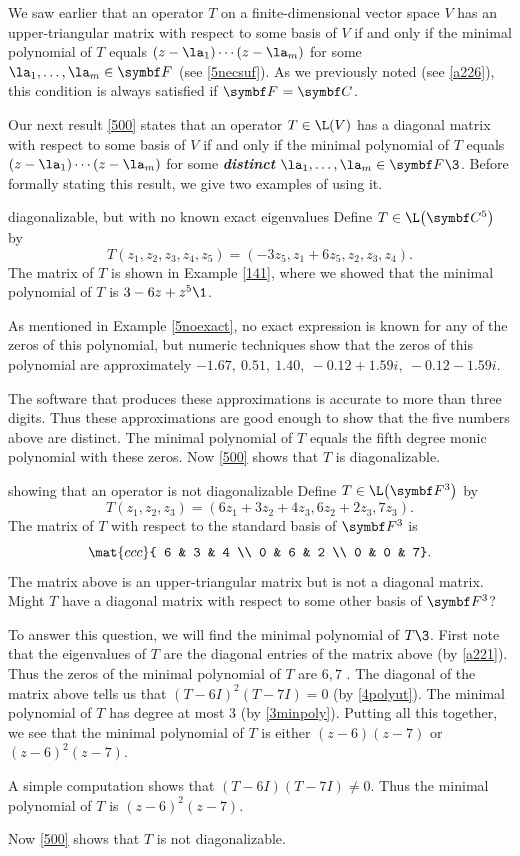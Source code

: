 We saw earlier that an operator $T$ on a finite-dimensional vector space $V$ has an upper-triangular matrix with respect to some basis of $V$ if and only if the minimal polynomial of $T$ equals $(z-\la_1) \cdots (z-\la_m)$ for some $\la_1, \ldots, \la_m \in \F{}$ (see \ref{5necsuf}). As we previously noted (see \ref{a226}), this condition is always satisfied if $\F{} = \C{}$.

Our next result \ref{500} states that an operator $T \in \L(V)$ has a diagonal matrix with respect to some basis of $V$ if and only if the minimal polynomial of $T$ equals $(z-\la_1) \cdots (z-\la_m)$ for some \textit{\textbf{distinct}} $\la_1, \ldots, \la_m \in \F{}\3$. Before formally stating this result, we give two examples of using it.

\begin{example}{diagonalizable, but with no known exact eigenvalues}
Define $T \in \L\paren[\big]{ \C5 }$ by
\[
T(z_1, z_2, z_3, z_4 ,z_5) = (-3z_5, z_1 + 6z_5, z_2, z_3, z_4).
\]
The matrix of $T$ is shown in Example \ref{141}, where we showed that the minimal polynomial of $T$ is $3 - 6z + z^5\1$.

As mentioned in Example \ref{5noexact}, no exact expression is known for any of the zeros of this polynomial, but numeric techniques show that the zeros of this polynomial are approximately
$
-1.67, \  0.51, \  1.40, \  -0.12 + 1.59i, \  -0.12 - 1.59i$.

The software that produces these approximations is accurate to more than three digits. Thus these approximations are good enough to show that the five numbers above are distinct. The minimal polynomial of $T$ equals the fifth degree monic polynomial with these zeros.
Now \ref{500} shows that $T$ is diagonalizable.
\end{example}

\begin{example}{showing that an operator is not diagonalizable}
Define $T \in \L\paren[\big]{\F{3}}$ by
\[
T(z_1, z_2, z_3) = (6z_1 + 3z_2 + 4z_3, 6z_2 + 2z_3, 7z_3).
\]
The matrix of $T$ with respect to the standard basis of $\F3$ is
\[
\mat{ccc}{ 6 & 3 & 4 \\
0 & 6 & 2 \\
0 & 0 & 7}.
\]
The matrix above is an upper-triangular matrix but is not a diagonal matrix. Might $T$ have a diagonal matrix with respect to some other basis of $\F3$?

To answer this question, we will find the minimal polynomial of $T\3$. First note that the eigenvalues of $T$ are the diagonal entries of the matrix above (by \ref{a221}). Thus the zeros of the minimal polynomial of $T$ are $6, 7$ . The diagonal of the matrix above tells us that $(T-6I)^2 (T-7I) = 0$ (by \ref{4polyut}). The minimal polynomial of $T$ has degree at most $3$ (by \ref{3minpoly}). Putting all this together, we see that the minimal polynomial of $T$ is either $(z-6)(z-7)$ or $(z-6)^2 (z-7)$.

A simple computation shows that
$
(T - 6I)(T - 7I) \ne 0$.
Thus the minimal polynomial of $T$ is $(z-6)^2 (z-7)$.

Now \ref{500} shows that $T$ is not diagonalizable.
\end{example}

